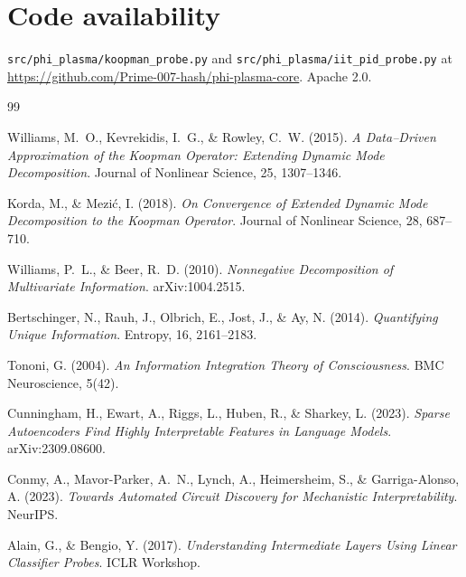 \documentclass[11pt]{article}
\begin{document}
\section*{Code availability}

\texttt{src/phi\_plasma/koopman\_probe.py} and
\texttt{src/phi\_plasma/iit\_pid\_probe.py} at \\
\url{https://github.com/Prime-007-hash/phi-plasma-core}. Apache 2.0.

\begin{thebibliography}{99}
\setlength{\itemsep}{2pt}

Williams, M.~O., Kevrekidis, I.~G., \& Rowley, C.~W. (2015).
\emph{A Data--Driven Approximation of the Koopman Operator: Extending
Dynamic Mode Decomposition}.
Journal of Nonlinear Science, 25, 1307--1346.

Korda, M., \& Mezić, I. (2018).
\emph{On Convergence of Extended Dynamic Mode Decomposition to the
Koopman Operator}.
Journal of Nonlinear Science, 28, 687--710.

Williams, P.~L., \& Beer, R.~D. (2010).
\emph{Nonnegative Decomposition of Multivariate Information}.
arXiv:1004.2515.

Bertschinger, N., Rauh, J., Olbrich, E., Jost, J., \& Ay, N. (2014).
\emph{Quantifying Unique Information}.
Entropy, 16, 2161--2183.

Tononi, G. (2004).
\emph{An Information Integration Theory of Consciousness}.
BMC Neuroscience, 5(42).

Cunningham, H., Ewart, A., Riggs, L., Huben, R., \& Sharkey, L. (2023).
\emph{Sparse Autoencoders Find Highly Interpretable Features in Language
Models}.
arXiv:2309.08600.

Conmy, A., Mavor-Parker, A.~N., Lynch, A., Heimersheim, S., \& Garriga-Alonso, A. (2023).
\emph{Towards Automated Circuit Discovery for Mechanistic Interpretability}.
NeurIPS.

Alain, G., \& Bengio, Y. (2017).
\emph{Understanding Intermediate Layers Using Linear Classifier Probes}.
ICLR Workshop.

\end{thebibliography}
\end{document}
